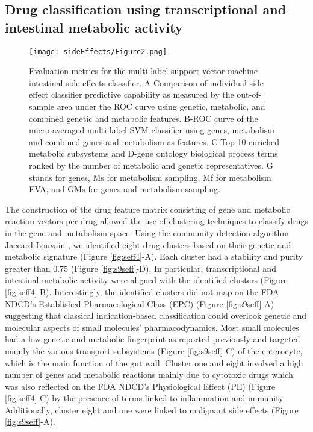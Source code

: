 \subsection{Drug  classification  using transcriptional and intestinal metabolic activity}
\begin{figure}[!ht]
\centering
	\texttt{[image: sideEffects/Figure2.png]}%
	\caption[Prediction performance of the multi-label SVM.]{Evaluation metrics for the multi-label support vector machine intestinal side effects classifier. A-Comparison of individual side effect classifier predictive capability as measured by the out-of-sample area under the ROC curve using genetic, metabolic, and combined genetic and metabolic features. B-ROC curve of the micro-averaged multi-label SVM classifier using genes, metabolism and combined genes and metabolism as features. C-Top 10 enriched metabolic subsystems and D-gene ontology biological process terms ranked by the number of metabolic and genetic representatives. G stands for genes, Ms for metabolism sampling, Mf for metabolism FVA, and GMs for genes and metabolism sampling.}
	\label{fig:seff2}
\end{figure}
\noindent The construction of the drug feature matrix consisting of gene and metabolic reaction vectors per drug allowed the use of clustering techniques to classify drugs in the gene and metabolism space. Using the community detection algorithm Jaccard-Louvain \cite{blondel2008fast}, we identified eight drug clusters based on their genetic and metabolic signature (Figure \ref{fig:seff4}-A). Each cluster had a stability and purity greater than 0.75 (Figure \ref{fig:s9seff}-D). In particular, transcriptional and intestinal metabolic activity were aligned with the identified clusters (Figure \ref{fig:seff4}-B). Interestingly, the identified clusters did not map on the FDA NDCD’s Established Pharmacological Class (EPC) (Figure \ref{fig:s9seff}-A) suggesting that classical indication-based classification could overlook genetic and molecular aspects of small molecules' pharmacodynamics. Most small molecules had a low genetic and  metabolic fingerprint as reported previously \cite{kuleshov2016enrichr} and targeted mainly the various transport subsystems (Figure \ref{fig:s9seff}-C) of the enterocyte, which is the main function of the gut wall. Cluster one and eight involved a high number of genes and metabolic reactions mainly due to cytotoxic drugs which was also reflected on the FDA NDCD’s Physiological Effect (PE) (Figure \ref{fig:seff4}-C) by the presence of terms linked to inflammation and immunity. Additionally, cluster eight and one were linked to malignant side effects (Figure \ref{fig:s9seff}-A).\\
